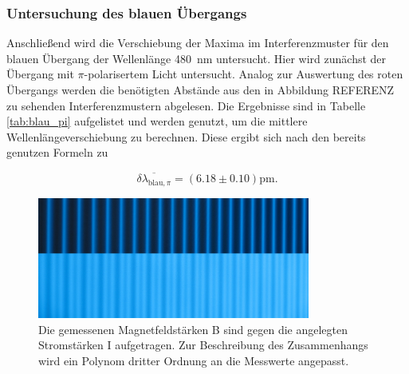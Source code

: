         \subsubsection*{Untersuchung des blauen Übergangs}
            Anschließend wird die Verschiebung der Maxima im Interferenzmuster für den blauen Übergang der Wellenlänge \SI{480}{\nano\metre} untersucht. Hier wird zunächst der Übergang mit $\pi$-polarisertem
            Licht untersucht. Analog zur Auswertung des roten Übergangs werden die benötigten Abstände aus den in Abbildung REFERENZ zu sehenden Interferenzmustern abgelesen. Die Ergebnisse sind in Tabelle 
            \ref{tab:blau_pi} aufgelistet und werden genutzt, um die mittlere Wellenlängeverschiebung zu berechnen. Diese ergibt sich nach den bereits genutzen Formeln zu 

            \begin{equation*}
                \overline{\delta \lambda_{\text{blau}, \pi}} = \left(6.18 \pm 0.10\right)\si{\pico\metre}.
            \end{equation*}

             


            \FloatBarrier

            \begin{figure}[h]
              \centering
              \includegraphics[width = 0.8\textwidth]{pictures/blau_pi.png}
              \caption{Die gemessenen Magnetfeldstärken B sind gegen die angelegten Stromstärken I aufgetragen. Zur Beschreibung des Zusammenhangs wird ein Polynom dritter Ordnung an die Messwerte angepasst.}
              \label{fig:blau_pi}
            \end{figure}
        
            \FloatBarrier

